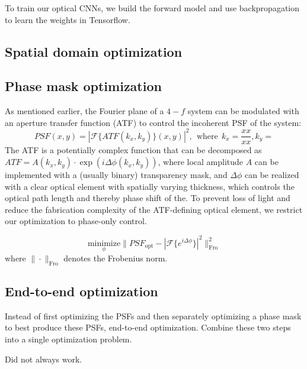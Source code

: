 To train our optical CNNs, we build the forward model and use backpropagation to learn the weights in Tensorflow. 

\subsection{Spatial domain optimization}

\subsection{Phase mask optimization}
As mentioned earlier, the Fourier plane of a $4-f$ system can be modulated with an aperture transfer function (ATF) to control the incoherent PSF of the system:
\begin{equation} PSF(x,y) = |\mathcal{F}\{ATF(k_x, k_y)\}(x,y)|^2, \ \ \text{where} \ \  k_x = \frac{xx}{xx}, k_y = \end{equation}
The ATF is a potentially complex function that can be decomposed as $ATF = A(k_x, k_y)\cdot \exp(i \Delta \phi (k_x, k_y))$, where local amplitude $A$ can be implemented with a (usually binary) transparency mask, and $\Delta \phi$ can be realized with a clear optical element with spatially varying thickness, which controls the optical path length and thereby phase shift of the. To prevent loss of light and reduce the fabrication complexity of the ATF-defining optical element, we restrict our optimization to phase-only control. 

\begin{equation} \underset{\phi}{\text{minimize}} \|PSF_\text{opt} - |\mathcal{F}\{e^{i\Delta \phi}\}|^2\|^2_\text{Fro}
\end{equation}
where $\|\cdot\|_\text{Fro}$ denotes the Frobenius norm.

\subsection{End-to-end optimization}
Instead of first optimizing the PSFs and then separately optimizing a phase mask to best produce these PSFs, end-to-end optimization. Combine these two steps into a single optimization problem.

Did not always work. 